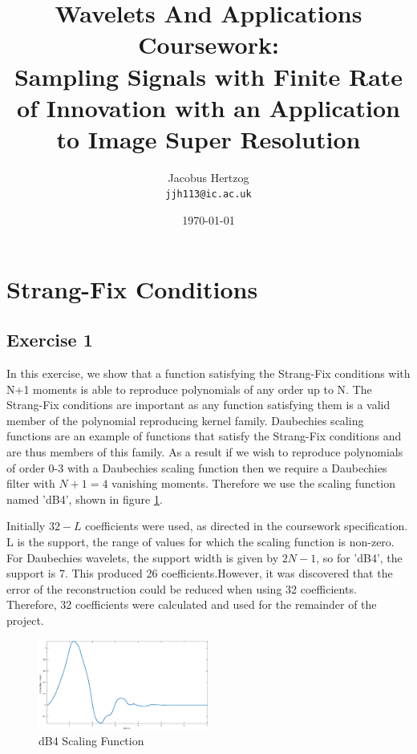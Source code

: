\documentclass[a4paper]{article}
\author{Jacobus Hertzog\\
  \texttt{jjh113@ic.ac.uk}}
\title{Wavelets And Applications Coursework: \\ Sampling Signals with Finite Rate of Innovation with an Application to Image Super Resolution}
\date{\today}
\begin{document}
\maketitle

\tableofcontents
\newpage


\section{Strang-Fix Conditions}
\subsection{Exercise 1}

In this exercise, we show that a function satisfying the Strang-Fix conditions with N+1 moments is able to reproduce polynomials of any order up to N. The Strang-Fix conditions are important as any function satisfying them is a valid member of the polynomial reproducing kernel family. Daubechies scaling functions are an example of functions that satisfy the Strang-Fix conditions and are thus members of this family. As a result if we wish to reproduce polynomials of order 0-3 with a Daubechies scaling function then we require a Daubechies filter with $N+1=4$ vanishing moments. Therefore we use the scaling function named ’dB4’, shown in figure \ref{fig:ex1_db4}.

Initially $32-L$ coefficients were used, as directed in the coursework specification. L is the support, the range of values for which the scaling function is non-zero. For Daubechies wavelets, the support width is given by $2N-1$, so for 'dB4', the support is 7. This produced 26 coefficients.However, it was discovered that the error of the reconstruction could be reduced when using 32 coefficients. Therefore, 32 coefficients were calculated and used for the remainder of the project.

\begin{figure}[!ht]
    \centering
    \includegraphics[width=0.5\textwidth]{../images/ex1_db4}
    \caption{dB4 Scaling Function}
    \label{fig:ex1_db4}
\end{figure}
\end{document}
